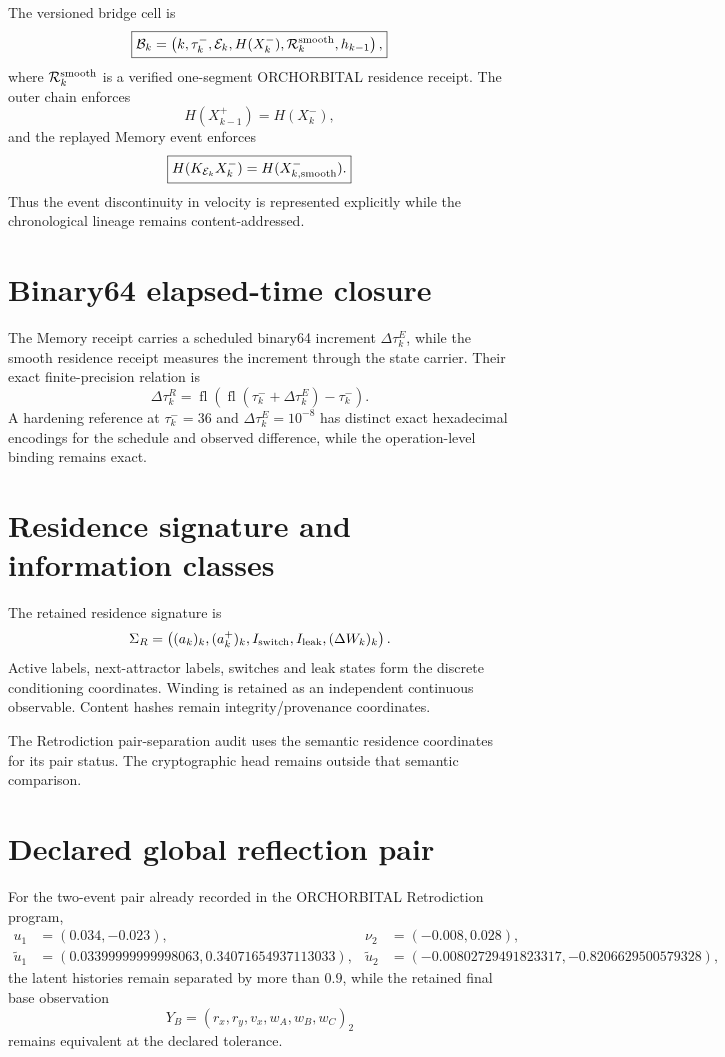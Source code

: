 \documentclass[11pt]{book}
\begin{document}
The versioned bridge cell is
\[
\boxed{
\mathcal B_k=
\left(
 k,
 \tau_k^-,
 \mathcal E_k,
 H(X_k^-),
 \mathcal R_k^{\rm smooth},
 h_{k-1}
\right),
}
\]
where \(\mathcal R_k^{\rm smooth}\) is a verified one-segment ORCHORBITAL residence receipt. The outer chain enforces
\[
\boxed{H(X_{k-1}^+)=H(X_k^-)},
\]
and the replayed Memory event enforces
\[
\boxed{
H(K_{\mathcal E_k}X_k^-)
=H(X_{k,\rm smooth}^-).
}
\]
Thus the event discontinuity in velocity is represented explicitly while the chronological lineage remains content-addressed.

\section{Binary64 elapsed-time closure}

The Memory receipt carries a scheduled binary64 increment \(\Delta\tau_k^E\), while the smooth residence receipt measures the increment through the state carrier. Their exact finite-precision relation is
\[
\boxed{
\Delta\tau_k^R
=
\operatorname{fl}
\left(
\operatorname{fl}(\tau_k^-+\Delta\tau_k^E)-\tau_k^-
\right).
}
\]
A hardening reference at \(\tau_k^-=36\) and \(\Delta\tau_k^E=10^{-8}\) has distinct exact hexadecimal encodings for the schedule and observed difference, while the operation-level binding remains exact.

\section{Residence signature and information classes}

The retained residence signature is
\[
\Sigma_R=
\left(
(a_k)_k,
(a_k^+)_k,
I_{\rm switch},
I_{\rm leak},
(\Delta W_k)_k
\right).
\]
Active labels, next-attractor labels, switches and leak states form the discrete conditioning coordinates. Winding is retained as an independent continuous observable. Content hashes remain integrity/provenance coordinates.

The Retrodiction pair-separation audit uses the semantic residence coordinates for its pair status. The cryptographic head remains outside that semantic comparison.

\section{Declared global reflection pair}

For the two-event pair already recorded in the ORCHORBITAL Retrodiction program,
\[
\begin{aligned}
u_1&=(0.034,-0.023), &
\nu_2&=(-0.008,0.028),\\
\widetilde u_1&=(0.03399999999998063,0.34071654937113033), &
\widetilde u_2&=(-0.00802729491823317,-0.8206629500579328),
\end{aligned}
\]
the latent histories remain separated by more than \(0.9\), while the retained final base observation
\[
Y_B=(r_x,r_y,v_x,w_A,w_B,w_C)_2
\]
remains equivalent at the declared tolerance.
\end{document}
